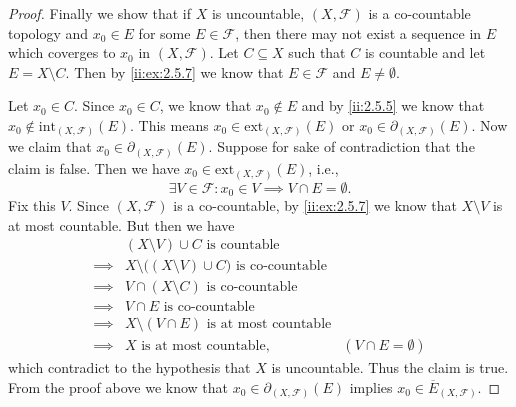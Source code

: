 \begin{proof}
  Finally we show that if \(X\) is uncountable, \((X, \mathcal{F})\) is a co-countable topology and \(x_0 \in E\) for some \(E \in \mathcal{F}\), then there may not exist a sequence in \(E\) which coverges to \(x_0\) in \((X, \mathcal{F})\).
  Let \(C \subseteq X\) such that \(C\) is countable and let \(E = X \setminus C\).
  Then by \cref{ii:ex:2.5.7} we know that \(E \in \mathcal{F}\) and \(E \neq \emptyset\).

  Let \(x_0 \in C\).
  Since \(x_0 \in C\), we know that \(x_0 \notin E\) and by \cref{ii:2.5.5} we know that \(x_0 \notin \text{int}_{(X, \mathcal{F})}(E)\).
  This means \(x_0 \in \text{ext}_{(X, \mathcal{F})}(E)\) or \(x_0 \in \partial_{(X, \mathcal{F})}(E)\).
  Now we claim that \(x_0 \in \partial_{(X, \mathcal{F})}(E)\).
  Suppose for sake of contradiction that the claim is false.
  Then we have \(x_0 \in \text{ext}_{(X, \mathcal{F})}(E)\), i.e.,
  \[
    \exists V \in \mathcal{F} : x_0 \in V \implies V \cap E = \emptyset.
  \]
  Fix this \(V\).
  Since \((X, \mathcal{F})\) is a co-countable, by \cref{ii:ex:2.5.7} we know that \(X \setminus V\) is at most countable.
  But then we have
  \begin{align*}
             & (X \setminus V) \cup C \text{ is countable}                                                   \\
    \implies & X \setminus \big((X \setminus V) \cup C\big) \text{ is co-countable}                          \\
    \implies & V \cap (X \setminus C) \text{ is co-countable}                                                \\
    \implies & V \cap E \text{ is co-countable}                                                              \\
    \implies & X \setminus (V \cap E) \text{ is at most countable}                                           \\
    \implies & X \text{ is at most countable},                                      & (V \cap E = \emptyset)
  \end{align*}
  which contradict to the hypothesis that \(X\) is uncountable.
  Thus the claim is true.
  From the proof above we know that \(x_0 \in \partial_{(X, \mathcal{F})}(E)\) implies \(x_0 \in \overline{E}_{(X, \mathcal{F})}\).


\end{proof}
